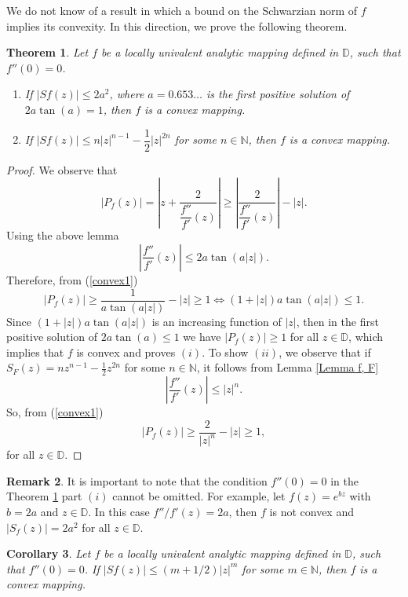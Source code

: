 \documentclass[reqno]{amsart}
\theoremstyle{plain}
\newtheorem{theo}{Theorem}[section]
\newtheorem{coro}[theo]{Corollary}
\theoremstyle{definition}
\newtheorem{rem}[theo]{Remark}
\newcommand{\D}{\mathbb{D}}
\begin{document}
We do not know of a result in which a bound on the Schwarzian norm of $f$ implies its convexity. In this direction, we prove the following theorem.

\begin{theo}\label{Teoconv}
Let $f$ be a locally univalent analytic mapping defined in $\D$, such that $f''(0)=0$.
\begin{enumerate}[wide]
    \item [$(i)$] If $|Sf(z)|\leq 2a^2$, where $a=0.653\ldots$ is the first positive solution of $2a\tan(a)=1$, then $f$ is a convex mapping.
  \item [$(ii)$] If $|Sf(z)|\leq n|z|^{n-1}-\dfrac{1}{2}|z|^{2n}$ for some $n\in \mathbb{N}$, then $f$ is a convex mapping. 
\end{enumerate}
\end{theo}

\begin{proof} We observe that
\begin{equation}\label{convex1}
 |P_f(z)| =\left|z+ \frac{2}{\dfrac{f''}{f'}(z)}\right| \geq \left|\frac{2}{\dfrac{f''}{f'}(z)}\right|-|z|.   
\end{equation}
Using the above lemma
\[ \left| \frac{f''}{f'}(z) \right| \leq 2a \tan(a|z|).\]
Therefore, from (\ref{convex1})
\[|P_f(z)| \geq \frac{1}{a \tan(a|z|)} - |z| \geq 1\Leftrightarrow (1+|z|) a \tan(a|z|) \leq 1.\]
Since $(1+|z|) a \tan(a|z|)$ is an increasing function of $|z|$, then in the first positive solution of $2a \tan(a) \leq 1$ we have
$|P_f(z)| \geq 1$ for all $z \in \mathbb{D}$, which implies that $f$ is convex and proves $(i)$. To show $(ii)$, we observe that if $S_F(z)=nz^{n-1}-\frac{1}{2}z^{2n}$ for some $n\in \mathbb{N}$, it follows from Lemma \ref{Lemma f, F} 
\[ \left| \frac{f''}{f'}(z) \right| \leq |z|^n.\]
So, from (\ref{convex1}) 
\[|P_f(z)|\geq \frac{2}{|z|^n}-|z|\geq 1,\]
for all $z\in \D$.
\end{proof}

\begin{rem}
It is important to note that the condition $f''(0)=0$ in the Theorem \ref{Teoconv} part $(i)$ cannot be omitted. For example, let $f(z)=e^{bz}$ with $b=2a$ and $z\in\D$. In this case $f''/f'(z)=2a$, then $f$ is not convex and $|S_f(z)|=2a^2$ for all $z\in \D$.
\end{rem}

\begin{coro}
  Let $f$ be a locally univalent analytic mapping defined in $\D$, such that $f''(0)=0$. If $|Sf(z)|\leq (m+1/2)|z|^{m}$ for some $m\in \mathbb{N}$, then $f$ is a convex mapping.
\end{coro}
\end{document}
